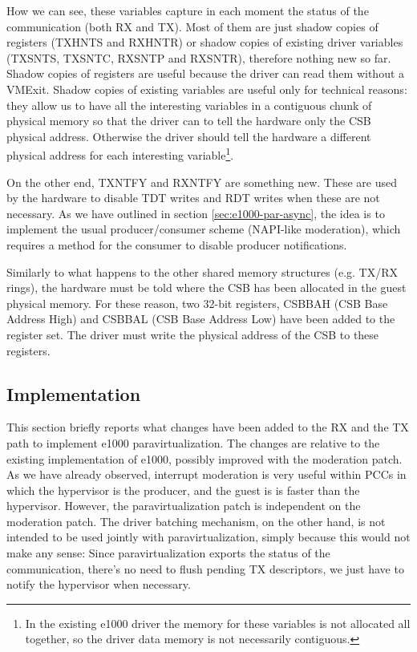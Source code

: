 \vspace{0.5cm}

How we can see, these variables capture in each moment the status of the communication (both RX and TX). Most of them are just shadow
copies of registers (TXHNTS and RXHNTR) or shadow copies of existing driver variables (TXSNTS, TXSNTC, RXSNTP and RXSNTR), therefore
nothing new so far. Shadow copies of registers are useful because the driver can read them without a VMExit. Shadow copies of existing
variables are useful only for technical reasons: they allow us to have all the interesting variables in a contiguous chunk of physical 
memory so that the driver can to tell the hardware only the CSB physical address. Otherwise the driver should tell the hardware a different
physical address for each interesting variable\footnote{In the existing e1000 driver the memory for these variables is not allocated all
together, so the driver data memory is not necessarily contiguous.}.

\vspace{0.5cm}

On the other end, TXNTFY and RXNTFY are something new. These are used by the hardware to disable TDT writes and RDT writes when
these are not necessary. As we have outlined in section \ref{sec:e1000-par-async}, the idea is to implement the usual
producer/consumer scheme (NAPI-like moderation), which requires a method for the consumer to disable producer notifications.

\vspace{0.5cm}

Similarly to what happens to the other shared memory structures (e.g. TX/RX rings), the hardware must be told where the CSB has been
allocated in the guest physical memory. For these reason, two 32-bit registers, CSBBAH (CSB Base Address High) and CSBBAL (CSB Base
Address Low) have been added to the register set. The driver must write the physical address of the CSB to these registers.


\subsection{Implementation}
This section briefly reports what changes have been added to the RX and the TX path to implement e1000 paravirtualization.
The changes are relative to the existing implementation of e1000, possibly improved with the moderation patch.
As we have already observed, interrupt moderation is very useful within PCCs in which the hypervisor is the producer, and the guest is
is faster than the hypervisor. However, the paravirtualization patch is independent on the moderation patch.
The driver batching mechanism, on the other hand, is not intended to be used jointly with paravirtualization, simply because this would not
make any sense: Since paravirtualization exports the status of the communication, there's no need to flush pending TX descriptors, we just
have to notify the hypervisor when necessary.

